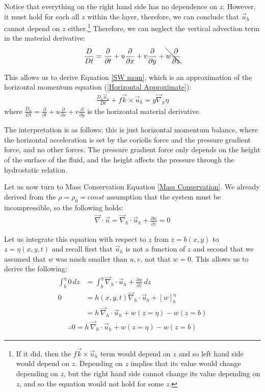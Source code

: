 Notice that everything on the right hand side has no dependence on $z$. However, it must hold for each all $z$ within the layer, therefore, we can conclude that $\vec{u}_h$ cannot depend on $z$ either.\footnote{
    If it did, then the $f\vec{k}\times\vec{u}_h$ term would depend on $z$ and so left hand side would depend on $z$. Depending on $z$ implies that its value would change depending on $z$, but the right hand side cannot change its value depending on $z$, and so the equation would not hold for some $z$.
} Therefore, we can neglect the vertical advection term in the material derivative:
\begin{align*}
    \frac{D}{Dt}=\frac{\partial}{\partial t}+u\frac{\partial}{\partial x}
    +v\frac{\partial}{\partial y}+\bcancel{w\frac{\partial}{\partial z}}
\end{align*}

This allows us to derive Equation \ref{SW mom}, which is an approximation of the horizontal momentum equation (\ref{Horizontal Approximate}):
\begin{align*}
    \boxed{\frac{D_h\vec{u}_h}{Dt}+f\vec{k}\times\vec{u}_h=g\vec{\nabla}_h\eta}
\end{align*}
where $\frac{D_h}{Dt}=\frac{\partial}{\partial t}+u\frac{\partial}{\partial x}+v\frac{\partial}{\partial y}$ is the horizontal material derivative.

The interpretation is as follows: this is just horizontal momentum balance, where the horizontal acceleration is set by the coriolis force and the pressure gradient force, and no other forces. The pressure gradient force only depends on the height of the surface of the fluid, and the height affects the pressure through the hydrostatic relation.

Let us now turn to Mass Conservation Equation \ref{Mass Conservation}. We already derived from the $\rho=\rho_0=const$ assumption that the system must be incompressible, so the following holds:
\begin{align*}
    \vec{\nabla}\cdot\vec{u}=\vec{\nabla}_h\cdot\vec{u}_h+\frac{\partial w}{\partial z}=0
\end{align*}

Let us integrate this equation with respect to $z$ from $z=b(x,y)$ to $z=\eta(x,y,t)$ and recall first that $\vec{u}_h$ is not a function of $z$ and second that we assumed that $w$ was much smaller than $u,v$, not that $w=0$. This allows us to derive the following:
\begin{align*}
    \int_{b}^{\eta} 0 \,dz &= \int_{b}^{\eta} \vec{\nabla}_h\cdot\vec{u}_h+\frac{\partial w}{\partial z}\, dz\\
    0&=h(x,y,t)\vec{\nabla}_h\cdot\vec{u}_h+\left[ w \right]_b^\eta\\
    &=h\,\vec{\nabla}_h\cdot\vec{u}_h + w(z=\eta)-w(z=b)
\end{align*}
\begin{align*}
    \therefore \boxed{0 = h\,\vec{\nabla}_h\cdot\vec{u}_h + w(z=\eta)-w(z=b)}
\end{align*}

